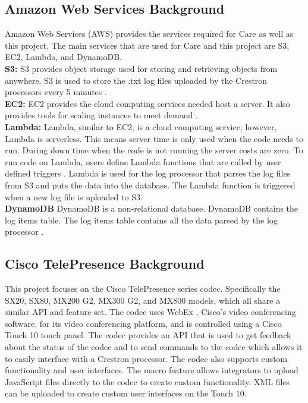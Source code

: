 \documentclass[letterpaper,12pt]{article}
\begin{document}
\subsection{Amazon Web Services Background}
Amazon Web Services (AWS) provides the services required for Care as well as this project. The main services that are used for Care and this project are S3, EC2, Lambda, and DynamoDB.\\

\textbf{S3:} S3 provides object storage used for storing and retrieving objects from anywhere. S3 is used to store the .txt log files uploaded by the Crestron processors every 5 minutes \cite{s3}.\\

\textbf{EC2:} EC2 provides the cloud computing services needed host a server. It also provides tools for scaling instances to meet demand \cite{ec2}.\\

\textbf{Lambda:} Lambda, similar to EC2, is a cloud computing service; however, Lambda is serverless. This means server time is only used when the code needs to run. During down time when the code is not running the server costs are zero. To run code on Lambda, users define Lambda functions that are called by user defined triggers \cite{lambda}. Lambda is used for the log processor that parses the log files from S3 and puts the data into the database. The Lambda function is triggered when a new log file is uploaded to S3.\\

\textbf{DynamoDB} DynamoDB is a non-relational database. DynamoDB contains the log items table. The log items table contains all the data parsed by the log processor \cite{dynamodb}.

\subsection{Cisco TelePresence Background}
This project focuses on the Cisco TelePresence series codec. Specifically the SX20, SX80, MX200 G2, MX300 G2, and MX800 models, which all share a similar API and feature set. The codec uses WebEx , Cisco's video conferencing software, for its video conferencing platform, and is controlled using a Cisco Touch 10 touch panel. The codec  provides an API that is used to get feedback about the status of the codec and to send commands to the codec which allows it to easily interface with a Crestron processor. The codec also supports custom functionality and user interfaces. The macro feature allows integrators to upload JavaScript files directly to the codec to create custom functionality. XML files can be uploaded to create custom user interfaces on the Touch 10.
\end{document}
